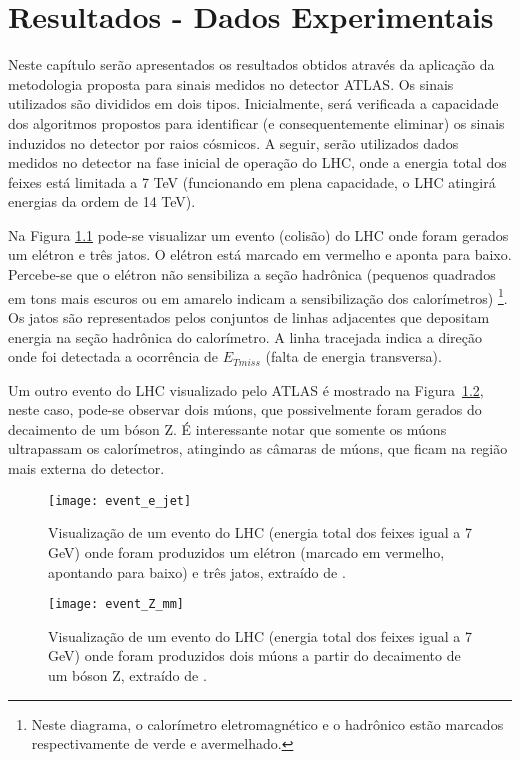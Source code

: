 \chapter{Resultados - Dados Experimentais}\label{cap_resul}

Neste capítulo serão apresentados os resultados obtidos através da
aplicação da metodologia proposta para sinais medidos no detector
ATLAS. Os sinais utilizados são divididos em dois tipos.
Inicialmente, será verificada a capacidade dos algoritmos
propostos para identificar (e consequentemente eliminar) os sinais
induzidos no detector por raios cósmicos. A seguir, serão
utilizados dados medidos no detector na fase inicial de operação
do LHC, onde a energia total dos feixes está limitada a 7 TeV
(funcionando em plena capacidade, o LHC atingirá energias da ordem
de 14 TeV).

Na Figura \ref{fig_evEJet} pode-se visualizar um evento (colisão)
do LHC onde foram gerados um elétron e três jatos. O elétron está
marcado em vermelho e aponta para baixo. Percebe-se que o elétron
não sensibiliza a seção hadrônica (pequenos quadrados em tons mais
escuros ou em amarelo indicam a sensibilização dos calorímetros)
\footnote{Neste diagrama, o calorímetro eletromagnético e o
hadrônico estão marcados respectivamente de verde e avermelhado.}.
Os jatos são representados pelos conjuntos de linhas adjacentes
que depositam energia na seção hadrônica do calorímetro. A linha
tracejada indica a direção onde foi detectada a ocorrência de
$E_{Tmiss}$ (falta de energia transversa).

Um outro evento do LHC visualizado pelo ATLAS é mostrado na
Figura~\ref{fig_evMu}, neste caso, pode-se observar dois múons,
que possivelmente foram gerados do decaimento de um bóson Z. É
interessante notar que somente os múons ultrapassam os
calorímetros, atingindo as câmaras de múons, que ficam na região
mais externa do detector.

\begin{figure}[th]
\centering
\texttt{[image: event\_e\_jet]}
\caption[Visualização de um evento do LHC (7 GeV) onde foram
produzidos um elétron e três jatos.]{Visualização de um evento do
LHC (energia total dos feixes igual a 7 GeV) onde foram produzidos
um elétron (marcado em vermelho, apontando para baixo) e três
jatos, extraído de \cite{Homepage:ATLAS}.} \label{fig_evEJet}
\end{figure}

\begin{figure}[th]
\centering
\texttt{[image: event\_Z\_mm]}
\caption[Visualização de um evento do LHC (7 GeV) onde foram
produzidos dois múons a partir do decaimento de um bóson
Z.]{Visualização de um evento do LHC (energia total dos feixes
igual a 7 GeV) onde foram produzidos dois múons a partir do
decaimento de um bóson Z, extraído de \cite{Homepage:ATLAS}.}
\label{fig_evMu}
\end{figure}

